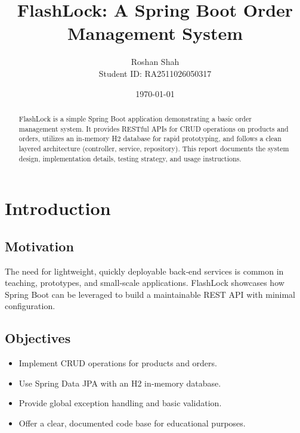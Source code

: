\documentclass[12pt,a4paper]{report}
\title{\Huge FlashLock: A Spring Boot Order Management System}
\author{Roshan Shah\\Student ID: RA2511026050317}
\date{\today}
\begin{document}


\maketitle
\thispagestyle{empty}
\clearpage

\begin{abstract}
    FlashLock is a simple Spring Boot application demonstrating a basic order management system. It provides RESTful APIs for CRUD operations on products and orders, utilizes an in‑memory H2 database for rapid prototyping, and follows a clean layered architecture (controller, service, repository). This report documents the system design, implementation details, testing strategy, and usage instructions.
\end{abstract}
\clearpage

\tableofcontents
\clearpage

\chapter{Introduction}
\section{Motivation}
The need for lightweight, quickly deployable back‑end services is common in teaching, prototypes, and small‑scale applications. FlashLock showcases how Spring Boot can be leveraged to build a maintainable REST API with minimal configuration.

\section{Objectives}
\begin{itemize}[noitemsep]
    \item Implement CRUD operations for products and orders.
    \item Use Spring Data JPA with an H2 in‑memory database.
    \item Provide global exception handling and basic validation.
    \item Offer a clear, documented code base for educational purposes.
\end{itemize}
\end{document}
